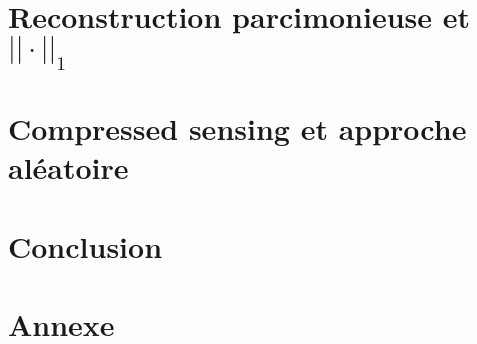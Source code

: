 \documentclass[french, 12pt]{report}
\theoremstyle{plain}
\theoremstyle{remark}
\theoremstyle{definition}
\begin{document}
\chapter{Reconstruction parcimonieuse et $||\cdot||_1$}


\chapter{Compressed sensing et approche aléatoire}


\chapter{Conclusion}



%

\appendix
\chapter{Annexe}


\printbibliography
\end{document}
